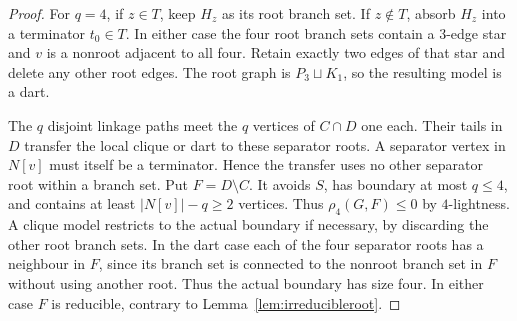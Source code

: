 \documentclass[11pt]{article}
\theoremstyle{remark}
\numberwithin{equation}{section}
\begin{document}
\begin{proof}
For $q=4$, if $z\in T$, keep $H_z$ as its root branch set. If $z\notin T$, absorb $H_z$ into a terminator $t_0\in T$. In either case the four root branch sets contain a 3-edge star and $v$ is a nonroot adjacent to all four. Retain exactly two edges of that star and delete any other root edges. The root graph is $P_3\sqcup K_1$, so the resulting model is a dart.

The $q$ disjoint linkage paths meet the $q$ vertices of $C\cap D$ one each. Their tails in $D$ transfer the local clique or dart to these separator roots. A separator vertex in $N[v]$ must itself be a terminator. Hence the transfer uses no other separator root within a branch set. Put $F=D\setminus C$. It avoids $S$, has boundary at most $q\le4$, and contains at least $|N[v]|-q\ge2$ vertices. Thus $\rho_4(G,F)\le0$ by $4$-lightness. A clique model restricts to the actual boundary if necessary, by discarding the other root branch sets. In the dart case each of the four separator roots has a neighbour in $F$, since its branch set is connected to the nonroot branch set in $F$ without using another root. Thus the actual boundary has size four. In either case $F$ is reducible, contrary to Lemma~\ref{lem:irreducibleroot}.
\end{proof}
\end{document}
